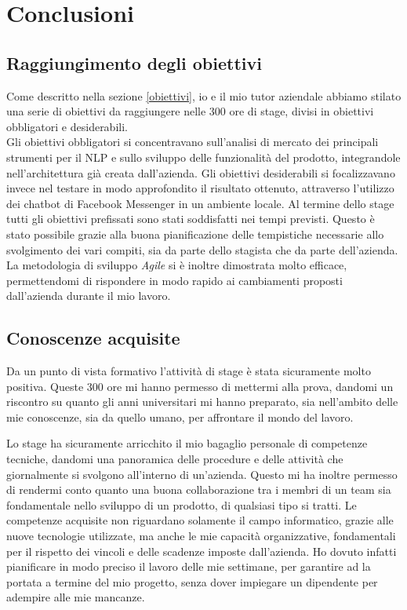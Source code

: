 
\chapter{Conclusioni}
\label{cap:conclusioni}

\section{Raggiungimento degli obiettivi}
Come descritto nella sezione \ref{obiettivi}, io e il mio tutor aziendale abbiamo stilato una serie di obiettivi da raggiungere nelle 300 ore di stage, divisi in obiettivi obbligatori e desiderabili. \\ 
Gli obiettivi obbligatori si concentravano sull'analisi di mercato dei principali strumenti per il \gls{NLP} e sullo sviluppo delle funzionalità del prodotto, integrandole nell'architettura già creata dall'azienda. Gli obiettivi desiderabili si focalizzavano invece nel testare in modo approfondito il risultato ottenuto, attraverso l'utilizzo dei \gls{chatbot} di Facebook Messenger in un ambiente locale. 
Al termine dello stage tutti gli obiettivi prefissati sono stati soddisfatti nei tempi previsti. Questo è stato possibile grazie alla buona pianificazione delle tempistiche necessarie allo svolgimento dei vari compiti, sia da parte dello stagista che da parte dell'azienda. La metodologia di sviluppo \emph{Agile} si è inoltre dimostrata molto efficace, permettendomi di rispondere in modo rapido ai cambiamenti proposti dall'azienda durante il mio lavoro. 
\section{Conoscenze acquisite}
Da un punto di vista formativo l'attività di stage è stata sicuramente molto positiva. Queste 300 ore mi hanno permesso di mettermi alla prova, dandomi un riscontro su quanto gli anni universitari mi hanno preparato, sia nell'ambito delle mie conoscenze, sia da quello umano, per affrontare il mondo del lavoro.


Lo stage ha sicuramente arricchito il mio bagaglio personale di competenze tecniche, dandomi una panoramica delle procedure e delle attività che giornalmente si svolgono all'interno di un'azienda. Questo mi ha inoltre permesso di rendermi conto quanto una buona collaborazione tra i membri di un team sia fondamentale nello sviluppo di un prodotto, di qualsiasi tipo si tratti.
Le competenze acquisite non riguardano solamente il campo informatico, grazie alle nuove tecnologie utilizzate, ma anche le mie capacità organizzative, fondamentali per il rispetto dei vincoli e delle scadenze imposte dall'azienda. Ho dovuto infatti pianificare in modo preciso il lavoro delle mie settimane, per garantire ad \azienda{} la portata a termine del mio progetto, senza dover impiegare un dipendente per adempire alle mie mancanze. 

